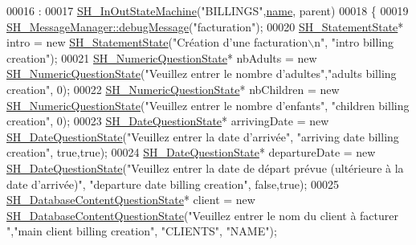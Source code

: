 \begin{DoxyCode}
00016                                                                                             :
00017     \hyperlink{classSH__InOutStateMachine_abd780037922920c674b43d80c2b50d16}{SH\_InOutStateMachine}(\textcolor{stringliteral}{"BILLINGS"},\hyperlink{classSH__NamedObject_a9f686c6f2a5bcc08ad03d0cee0151f0f}{name}, parent)
00018 \{
00019     \hyperlink{classSH__MessageManager_a379f2aa0a590a5add34dbe91f98b2ff7}{SH\_MessageManager::debugMessage}(\textcolor{stringliteral}{"facturation"});
00020     \hyperlink{classSH__StatementState}{SH\_StatementState}* intro = \textcolor{keyword}{new} \hyperlink{classSH__StatementState}{SH\_StatementState}(\textcolor{stringliteral}{"Création d'une
       facturation\(\backslash\)n"}, \textcolor{stringliteral}{"intro billing creation"});
00021     \hyperlink{classSH__NumericQuestionState}{SH\_NumericQuestionState}* nbAdults = \textcolor{keyword}{new} 
      \hyperlink{classSH__NumericQuestionState}{SH\_NumericQuestionState}(\textcolor{stringliteral}{"Veuillez entrer le nombre d'adultes"},\textcolor{stringliteral}{"adults billing
       creation"}, 0);
00022     \hyperlink{classSH__NumericQuestionState}{SH\_NumericQuestionState}* nbChildren = \textcolor{keyword}{new} 
      \hyperlink{classSH__NumericQuestionState}{SH\_NumericQuestionState}(\textcolor{stringliteral}{"Veuillez entrer le nombre d'enfants"}, \textcolor{stringliteral}{"children billing
       creation"}, 0);
00023     \hyperlink{classSH__DateQuestionState}{SH\_DateQuestionState}* arrivingDate = \textcolor{keyword}{new} 
      \hyperlink{classSH__DateQuestionState}{SH\_DateQuestionState}(\textcolor{stringliteral}{"Veuillez entrer la date d'arrivée"}, \textcolor{stringliteral}{"arriving date billing
       creation"}, \textcolor{keyword}{true},\textcolor{keyword}{true});
00024     \hyperlink{classSH__DateQuestionState}{SH\_DateQuestionState}* departureDate = \textcolor{keyword}{new} 
      \hyperlink{classSH__DateQuestionState}{SH\_DateQuestionState}(\textcolor{stringliteral}{"Veuillez entrer la date de départ prévue (ultérieure à la date
       d'arrivée)"}, \textcolor{stringliteral}{"departure date billing creation"}, \textcolor{keyword}{false},\textcolor{keyword}{true});
00025     \hyperlink{classSH__DatabaseContentQuestionState}{SH\_DatabaseContentQuestionState}* client = \textcolor{keyword}{new} 
      \hyperlink{classSH__DatabaseContentQuestionState}{SH\_DatabaseContentQuestionState}(\textcolor{stringliteral}{"Veuillez entrer le nom du client à facturer
      "},\textcolor{stringliteral}{"main client billing creation"}, \textcolor{stringliteral}{"CLIENTS"}, \textcolor{stringliteral}{"NAME"});

\end{DoxyCode}
